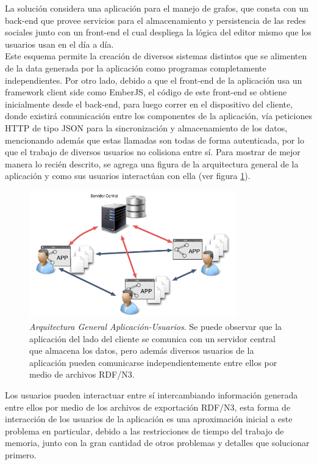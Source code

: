La solución considera una aplicación para el manejo de grafos, que consta con un back-end que provee servicios para el almacenamiento y persistencia de las redes sociales junto con un front-end el cual despliega la lógica del editor mismo que los usuarios usan en el día a día.\\

Este esquema permite la creación de diversos sistemas distintos que se alimenten de la data generada por la aplicación como programas completamente independientes. Por otro lado, debido a que el front-end de la aplicación usa un framework  client side como EmberJS, el código de este front-end se obtiene inicialmente desde el back-end, para luego correr en el dispositivo del cliente, donde existirá comunicación entre los componentes de la aplicación, vía peticiones HTTP de tipo JSON para la sincronización y almacenamiento de los datos, mencionando además que estas llamadas son todas de forma autenticada, por lo que el trabajo de diversos usuarios no colisiona entre sí. Para mostrar de mejor manera lo recién descrito, se agrega una figura de la arquitectura general de la aplicación y como sus usuarios interactúan con ella (ver figura \ref{app_distribuida}).

\begin{figure}[H]
  \centering
  \includegraphics[width=0.8\textwidth]{images/app_distribuida.png}
  \caption[Arquitectura General Aplicación-Usuarios]{\emph{Arquitectura General Aplicación-Usuarios}. Se puede observar que la aplicación del lado del cliente se comunica con un servidor central que almacena los datos, pero además diversos usuarios de la aplicación pueden comunicarse independientemente entre ellos por medio de archivos RDF/N3.}
  \label{app_distribuida}
\end{figure}

Los usuarios pueden interactuar entre sí intercambiando información generada entre ellos por medio de los archivos de exportación RDF/N3, esta forma de interacción de los usuarios de la aplicación es una aproximación inicial a este problema en particular, debido a las restricciones de tiempo del trabajo de memoria, junto con la gran cantidad de otros problemas y detalles que solucionar primero.\\

